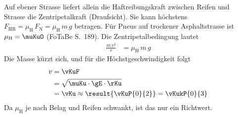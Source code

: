 \begin{center}
\end{center}

Auf ebener Strasse liefert allein die Haftreibungskraft zwischen Reifen und Strasse die Zentripetalkraft (Draufsicht). Sie kann höchstens $F_\mathrm{HR} = \mu_\mathrm{H}\,F_\mathrm{N} = \mu_\mathrm{H}\,m\,g$ betragen. Für Pneus auf trockener Asphaltstrasse ist $\mu_\mathrm{H} = \muKuO$ (FoTaBe S.~189). Die Zentripetalbedingung lautet
\begin{align}
 \frac{m\,v^2}{r} &= \mu_\mathrm{H}\,m\,g
\end{align}
Die Masse kürzt sich, und für die Höchstgeschwindigkeit folgt
\begin{align}
 v &= \vKuF \\
   &= \sqrt{\muKu\cdot\gE\cdot\rKu} \\
   &= \vKu \approx \result{\vKuP{0}{2}} = \vKukP{0}{3}
\end{align}
Da $\mu_\mathrm{H}$ je nach Belag und Reifen schwankt, ist das nur ein Richtwert.
